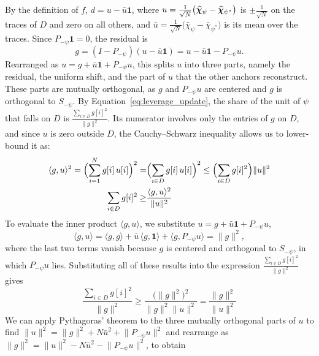 \documentclass[titlepage,a4paper,11pt]{report}
\begin{document}
    By the definition of $f$, $d=u-\bar u\mathbf{1}$, where $u=\frac{1}{\sqrt N}\bigl(\bm{\widehat\chi}_\psi-\bm{\widehat\chi}_{\psi^\ast}\bigr)$ is $\pm\frac{1}{\sqrt N}$ on the traces of $D$ and zero on all others, and $\bar u=\frac{1}{\sqrt N}\bigl(\bar\chi_\psi-\bar\chi_{\psi^\ast}\bigr)$ is its mean over the traces. Since $P_{-\psi}\mathbf{1}=0$, the residual is
    \begin{equation}\label{eq:residual_from_difference}
        g=(I-P_{-\psi})(u-\bar u\mathbf{1})=u-\bar u\mathbf{1}-P_{-\psi}u.
    \end{equation}
    Rearranged as $u=g+\bar u\mathbf{1}+P_{-\psi}u$, this splits $u$ into three parts, namely the residual, the uniform shift, and the part of $u$ that the other anchors reconstruct. These parts are mutually orthogonal, as $g$ and $P_{-\psi}u$ are centered and $g$ is orthogonal to $S_{-\psi}$. By Equation~\eqref{eq:leverage_update}, the share of the unit of $\psi$ that falls on $D$ is $\frac{\sum_{i\in D}g[i]^2}{\lVert g\rVert^2}$. Its numerator involves only the entries of $g$ on $D$, and since $u$ is zero outside $D$, the Cauchy--Schwarz inequality allows us to lower-bound it as:
    \begin{equation}\label{eq:inner_product_bound}
    \begin{split}
        \langle g,u\rangle^2=\Bigl(\sum_{i=1}^{N}g[i]\,u[i]\Bigr)^2=&\Bigl(\sum_{i\in D}g[i]\,u[i]\Bigr)^2\le\Bigl(\sum_{i\in D}g[i]^2\Bigr)\lVert u\rVert^2\\
        \sum_{i\in D}g[i]^2 \ge & \frac{\langle g,u\rangle^2}{\lVert u\rVert^2}
    \end{split}
    \end{equation}
    To evaluate the inner product $\langle g,u\rangle$, we substitute $u=g+\bar u\mathbf{1}+P_{-\psi}u$,
    \begin{equation*}
        \langle g,u\rangle=\langle g,g\rangle+\bar u\,\langle g,\mathbf{1}\rangle+\langle g,P_{-\psi}u\rangle=\lVert g\rVert^2,
    \end{equation*}
    where the last two terms vanish because $g$ is centered and orthogonal to $S_{-\psi}$, in which $P_{-\psi}u$ lies. Substituting all of these results into the expression $\frac{\sum_{i\in D}g[i]^2}{\lVert g\rVert^2}$ gives
    \begin{equation*}
        \frac{\sum_{i\in D}g[i]^2}{\lVert g\rVert^2} \ge \frac{\bigl(\lVert g\rVert^2\bigr)^2}{\lVert g\rVert^2 \lVert u\rVert^2} = \frac{\lVert g\rVert^2}{\lVert u\rVert^2}
    \end{equation*}
    We can apply Pythagoras' theorem to the three mutually orthogonal parts of $u$ to find $\lVert u \rVert^2 =\lVert g\rVert^2+N\bar u^2+\lVert P_{-\psi}u\rVert^2$ and rearrange as $\lVert g \rVert^2 =\lVert u\rVert^2-N\bar u^2-\lVert P_{-\psi}u\rVert^2$, to obtain
\end{document}
